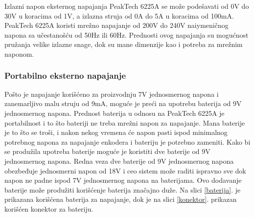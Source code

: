 \documentclass[a4paper, 12pt, diplomski]{etf}
\begin{document}
\noindent
Izlazni napon eksternog napajanja PeakTech 6225A se može podešavati od 0V do 30V u koracima od 1V, a izlazna struja od 0A do 5A u koracima od 100mA. PeakTech 6225A koristi mrežno napajanje od 200V do 240V naiymeničnog napona sa učestanošću od 50Hz ili 60Hz.
Prednosti ovog napajanja su mogućnost pružanja velike izlazne snage, dok su mane dimenzije kao i potreba za mrežnim naponom.


\subsubsection{Portabilno eksterno napajanje}

Pošto je napajanje korišćeno za proizvodnju 7V jednosmernog napona i zanemarljivo malu struju od 9mA, moguće je preći na upotrebu baterija od 9V jednosmernog napona. Prednost baterija u odnosu na PeakTech 6225A je portabilnost i to što bateriji ne treba mrežni napon za napajanje. Mana baterije je to što se troši, i nakon nekog vremena će napon pasti ispod minimalnog potrebnog napona za napajanje enkodera i bateriju je potrebno zameniti. Kako bi se produžila upotreba baterije moguće je koristiti dve baterije od 9V jednosmernog napona. Redna veza dve baterije od 9V jednosmernog napona obezbeđuje jednosmerni napon od 18V i ceo sistem može raditi ispravno sve dok napon ne padne ispod 7V jednosmernog napona na baterijama. Ovo dodavanje baterije može produžiti korišćenje baterija značajno duže. Na slici \ref{baterija}. je prikazana korišćena baterija za napajanje, dok je na slici \ref{konektor}. prikazan korišćen konektor za bateriju.
\end{document}
